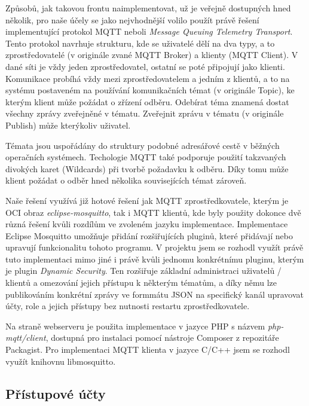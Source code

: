 Způsobů, jak takovou frontu naimplementovat, už je veřejně dostupných hned několik, pro naše účely se jako nejvhodnější volilo použít právě řešení implementující protokol MQTT neboli \emph{Message Queuing Telemetry Transport}. Tento protokol navrhuje strukturu, kde se uživatelé dělí na dva typy, a to zprostředovatelé (v originále zvané MQTT Broker) a klienty (MQTT Client). V dané síti je vždy jeden zprostředovatel, ostatní se poté připojují jako klienti. Komunikace probíhá vždy mezi zprostředovatelem a jedním z klientů, a to na systému postaveném na používání komunikačních témat (v originále Topic), ke kterým klient může požádat o zřízení odběru. Odebírat téma znamená dostat všechny zprávy zveřejněné v tématu. Zveřejnit zprávu v tématu (v originále Publish) může kterýkoliv uživatel.

Témata jsou uspořádány do struktury podobné adresářové cestě v běžných operačních systémech. Techologie MQTT také podporuje použití takzvaných divokých karet (Wildcards) při tvorbě požadavku k odběru. Díky tomu může klient požádat o odběr hned několika souvisejících témat zároveň.

Naše řešení využívá již hotové řešení jak MQTT zprostředkovatele, kterým je OCI obraz \emph{eclipse-mosquitto}, tak i MQTT klientů, kde byly použity dokonce dvě různá řešení kvůli rozdílům ve zvoleném jazyku implementace. Implementace Eclipse Mosquitto umožňuje přidání rozšiřujících pluginů, které přidávají nebo upravují funkcionalitu tohoto programu. V projektu jsem se rozhodl využít právě tuto implementaci mimo jiné i právě kvůli jednomu konkrétnímu pluginu, kterým je plugin \emph{Dynamic Security}. Ten rozšiřuje základní administraci uživatelů / klientů a omezování jejich přístupu k některým tématům, a díky němu lze publikováním konkrétní zprávy ve formmátu JSON na specifický kanál
upravovat účty, role a jejich přístupy bez nutnosti restartu zprostředkovatele.

Na straně webserveru je použita implementace v jazyce PHP s názvem \emph{php-mqtt/client}, dostupná pro instalaci pomocí nástroje Composer z repozitáře Packagist. Pro implementaci MQTT klienta v jazyce C/C++ jsem se rozhodl využít knihovnu libmosquitto.

\subsection{Přístupové účty}

